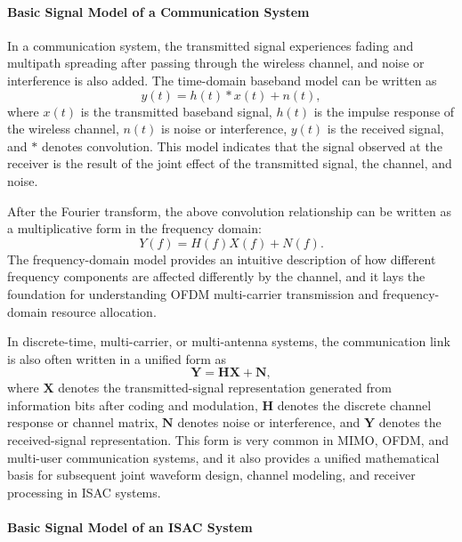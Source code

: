 \paragraph{Basic Signal Model of a Communication System}

In a communication system,
the transmitted signal experiences fading and multipath spreading after passing through the wireless channel,
and noise or interference is also added.
The time-domain baseband model can be written as
\begin{equation}
    y(t) = h(t) * x(t) + n(t),
    \label{eq:comm_time_domain_model}
\end{equation}
where \(x(t)\) is the transmitted baseband signal,
\(h(t)\) is the impulse response of the wireless channel,
\(n(t)\) is noise or interference,
\(y(t)\) is the received signal,
and \(*\) denotes convolution.
This model indicates that the signal observed at the receiver is the result of the joint effect
of the transmitted signal,
the channel,
and noise.

After the Fourier transform,
the above convolution relationship can be written as a multiplicative form in the frequency domain:
\begin{equation}
    Y(f) = H(f)X(f) + N(f).
    \label{eq:comm_frequency_domain_model}
\end{equation}
The frequency-domain model provides an intuitive description of how different frequency components
are affected differently by the channel,
and it lays the foundation for understanding OFDM multi-carrier transmission
and frequency-domain resource allocation.

In discrete-time,
multi-carrier,
or multi-antenna systems,
the communication link is also often written in a unified form as
\begin{equation}
    \mathbf{Y} = \mathbf{H}\mathbf{X} + \mathbf{N},
    \label{eq:comm_matrix_model}
\end{equation}
where \(\mathbf{X}\) denotes the transmitted-signal representation generated from information bits
after coding and modulation,
\(\mathbf{H}\) denotes the discrete channel response or channel matrix,
\(\mathbf{N}\) denotes noise or interference,
and \(\mathbf{Y}\) denotes the received-signal representation.
This form is very common in MIMO,
OFDM,
and multi-user communication systems,
and it also provides a unified mathematical basis for subsequent joint waveform design,
channel modeling,
and receiver processing in ISAC systems.

\paragraph{Basic Signal Model of an ISAC System}


